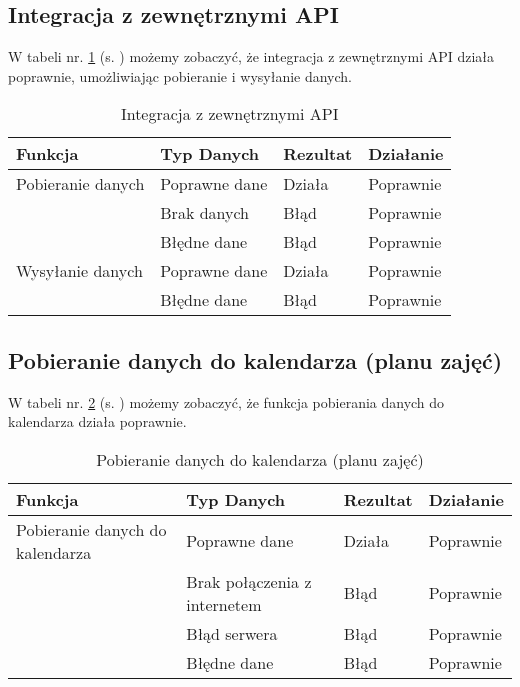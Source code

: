 \subsection{Integracja z zewnętrznymi API}
W tabeli nr. \ref{tab:tabelka014} (s. \pageref{tab:tabelka014}) możemy zobaczyć, że integracja z zewnętrznymi API działa poprawnie, umożliwiając pobieranie i wysyłanie danych.
\begin{table}[h!]
	\centering
	\begin{tabularx}{\textwidth}{|X|>{\arraybackslash}m{}|X|X|}
		\hline
		\textbf{Funkcja}  & \textbf{Typ Danych} & \textbf{Rezultat} & \textbf{Działanie} \\ \hline
		Pobieranie danych & Poprawne dane       & Działa            & Poprawnie          \\ \hline
		                  & Brak danych         & Błąd              & Poprawnie          \\ \hline
		                  & Błędne dane         & Błąd              & Poprawnie          \\ \hline
		Wysyłanie danych  & Poprawne dane       & Działa            & Poprawnie          \\ \hline
		                  & Błędne dane         & Błąd              & Poprawnie          \\ \hline
	\end{tabularx}
	\caption{Integracja z zewnętrznymi API}
	\label{tab:tabelka014}
\end{table}
\newpage
\subsection{Pobieranie danych do kalendarza (planu zajęć)}
W tabeli nr. \ref{tab:tabelka013} (s. \pageref{tab:tabelka013}) możemy zobaczyć, że funkcja pobierania danych do kalendarza działa poprawnie.
\begin{table}[h!]
	\centering
	\begin{tabularx}{\textwidth}{|X|>{\arraybackslash}m{}|X|X|}
		\hline
		\textbf{Funkcja}                & \textbf{Typ Danych}          & \textbf{Rezultat} & \textbf{Działanie} \\ \hline
		Pobieranie danych do kalendarza & Poprawne dane                & Działa            & Poprawnie          \\ \hline
		                                & Brak połączenia z internetem & Błąd              & Poprawnie          \\ \hline
		                                & Błąd serwera                 & Błąd              & Poprawnie          \\ \hline
		                                & Błędne dane                  & Błąd              & Poprawnie          \\ \hline
	\end{tabularx}
	\caption{Pobieranie danych do kalendarza (planu zajęć)}
	\label{tab:tabelka013}
\end{table}

